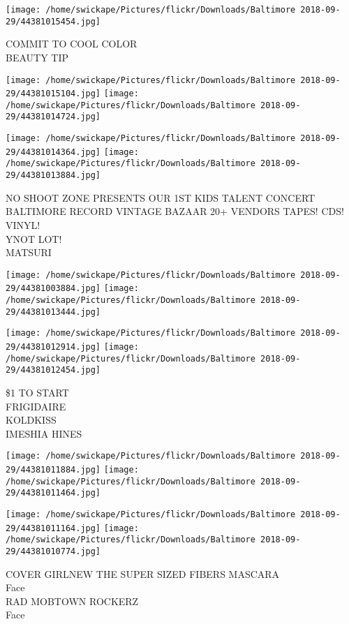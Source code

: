 \documentclass[10pt,letterpaper]{article}
\begin{document}
\vspace{0.25in}
\texttt{[image: /home/swickape/Pictures/flickr/Downloads/Baltimore 2018-09-29/44381015454.jpg]}

COMMIT TO COOL COLOR\\
BEAUTY TIP
\pagebreak

\texttt{[image: /home/swickape/Pictures/flickr/Downloads/Baltimore 2018-09-29/44381015104.jpg]}
\texttt{[image: /home/swickape/Pictures/flickr/Downloads/Baltimore 2018-09-29/44381014724.jpg]}

\texttt{[image: /home/swickape/Pictures/flickr/Downloads/Baltimore 2018-09-29/44381014364.jpg]}
\texttt{[image: /home/swickape/Pictures/flickr/Downloads/Baltimore 2018-09-29/44381013884.jpg]}

NO SHOOT ZONE PRESENTS OUR 1ST KIDS TALENT CONCERT\\
BALTIMORE RECORD VINTAGE BAZAAR 20+ VENDORS TAPES!  CDS!  VINYL!\\
YNOT LOT!\\
MATSURI
\pagebreak

\texttt{[image: /home/swickape/Pictures/flickr/Downloads/Baltimore 2018-09-29/44381003884.jpg]}
\texttt{[image: /home/swickape/Pictures/flickr/Downloads/Baltimore 2018-09-29/44381013444.jpg]}

\texttt{[image: /home/swickape/Pictures/flickr/Downloads/Baltimore 2018-09-29/44381012914.jpg]}
\texttt{[image: /home/swickape/Pictures/flickr/Downloads/Baltimore 2018-09-29/44381012454.jpg]}

\$1 TO START\\
FRIGIDAIRE\\
KOLDKISS\\
IMESHIA HINES
\pagebreak

\texttt{[image: /home/swickape/Pictures/flickr/Downloads/Baltimore 2018-09-29/44381011884.jpg]}
\texttt{[image: /home/swickape/Pictures/flickr/Downloads/Baltimore 2018-09-29/44381011464.jpg]}

\texttt{[image: /home/swickape/Pictures/flickr/Downloads/Baltimore 2018-09-29/44381011164.jpg]}
\texttt{[image: /home/swickape/Pictures/flickr/Downloads/Baltimore 2018-09-29/44381010774.jpg]}

COVER GIRLNEW THE SUPER SIZED FIBERS MASCARA\\
Face\\
RAD MOBTOWN ROCKERZ\\
Face
\pagebreak
\end{document}
